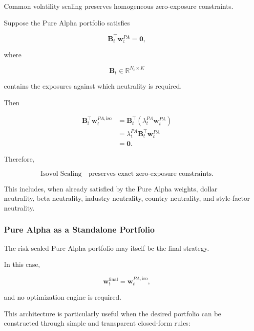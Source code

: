 \documentclass[11pt,a4paper]{article}
\begin{document}
Common volatility scaling preserves homogeneous zero-exposure constraints.

Suppose the Pure Alpha portfolio satisfies

\begin{equation}
\mathbf{B}_t^\top
\mathbf{w}_t^{PA}
=
\mathbf{0},
\end{equation}

where

\begin{equation}
\mathbf{B}_t
\in
\mathbb{R}^{N_t\times K}
\end{equation}

contains the exposures against which neutrality is required.

Then

\begin{equation}
\begin{aligned}
\mathbf{B}_t^\top
\mathbf{w}_t^{PA,\mathrm{iso}}
&=
\mathbf{B}_t^\top
\left(
\lambda_t^{PA}
\mathbf{w}_t^{PA}
\right)
\\
&=
\lambda_t^{PA}
\mathbf{B}_t^\top
\mathbf{w}_t^{PA}
\\
&=
\mathbf{0}.
\end{aligned}
\end{equation}

Therefore,

\begin{equation}
\boxed{
\text{Isovol Scaling}
\quad\text{preserves exact zero-exposure constraints}.
}
\end{equation}

This includes, when already satisfied by the Pure Alpha weights, dollar
neutrality, beta neutrality, industry neutrality, country neutrality, and
style-factor neutrality.


\subsubsection{Pure Alpha as a Standalone Portfolio}

The risk-scaled Pure Alpha portfolio may itself be the final strategy.

In this case,

\begin{equation}
\boxed{
\mathbf{w}_t^{\mathrm{final}}
=
\mathbf{w}_t^{PA,\mathrm{iso}},
}
\end{equation}

and no optimization engine is required.

This architecture is particularly useful when the desired portfolio can be
constructed through simple and transparent closed-form rules:
\end{document}

